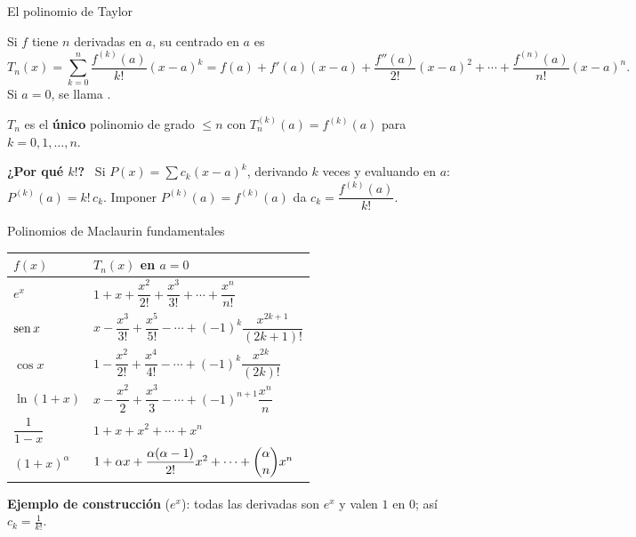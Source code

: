 \documentclass[10pt,aspectratio=169]{beamer}
\begin{document}
\begin{frame}{El polinomio de Taylor}
  \begin{definicion}
    Si $f$ tiene $n$ derivadas en $a$, su  centrado en $a$ es
    \[ T_n(x)=\sum_{k=0}^n\frac{f^{(k)}(a)}{k!}(x-a)^k=f(a)+f'(a)(x-a)+\frac{f''(a)}{2!}(x-a)^2+\cdots+\frac{f^{(n)}(a)}{n!}(x-a)^n. \]
    Si $a=0$, se llama .
  \end{definicion}
  \begin{teorema}
    $T_n$ es el \textbf{único} polinomio de grado $\le n$ con $T_n^{(k)}(a)=f^{(k)}(a)$ para $k=0,1,\dots,n$.
  \end{teorema}
  \textbf{¿Por qué $k!$?} \ Si $P(x)=\sum c_k(x-a)^k$, derivando $k$ veces y evaluando en $a$: $P^{(k)}(a)=k!\,c_k$.
  Imponer $P^{(k)}(a)=f^{(k)}(a)$ da $c_k=\dfrac{f^{(k)}(a)}{k!}$.
\end{frame}

\begin{frame}{Polinomios de Maclaurin fundamentales}
  \renewcommand{\arraystretch}{1.6}
  \begin{center}
    \begin{tabular}{l|l}
      $f(x)$ & $T_n(x)$ en $a=0$\\ \hline
      $e^x$ & $1+x+\dfrac{x^2}{2!}+\dfrac{x^3}{3!}+\cdots+\dfrac{x^n}{n!}$\\
      $\operatorname{sen} x$ & $x-\dfrac{x^3}{3!}+\dfrac{x^5}{5!}-\cdots+(-1)^k\dfrac{x^{2k+1}}{(2k+1)!}$\\
      $\cos x$ & $1-\dfrac{x^2}{2!}+\dfrac{x^4}{4!}-\cdots+(-1)^k\dfrac{x^{2k}}{(2k)!}$\\
      $\ln(1+x)$ & $x-\dfrac{x^2}{2}+\dfrac{x^3}{3}-\cdots+(-1)^{n+1}\dfrac{x^n}{n}$\\
      $\dfrac{1}{1-x}$ & $1+x+x^2+\cdots+x^n$\\
      $(1+x)^\alpha$ & $1+\alpha x+\dfrac{\alpha(\alpha-1)}{2!}x^2+\cdots+\dbinom{\alpha}{n}x^n$
    \end{tabular}
  \end{center}
  \small \textbf{Ejemplo de construcción} ($e^x$): todas las derivadas son $e^x$ y valen $1$ en $0$; así $c_k=\frac1{k!}$.
\end{frame}
\end{document}
